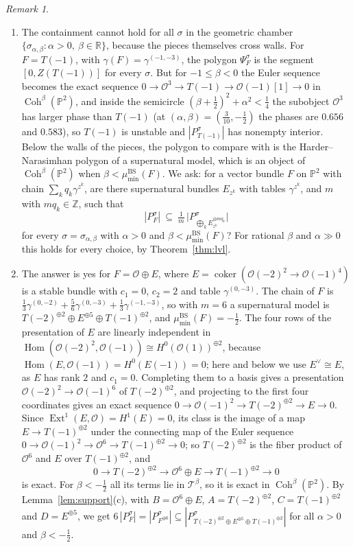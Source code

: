 \documentclass[11pt]{amsart}
\theoremstyle{definition}
\theoremstyle{remark}
\newtheorem{remark}[theorem]{Remark}
\newcommand{\PP}{\mathbb{P}}
\newcommand{\RR}{\mathbb{R}}
\newcommand{\ZZ}{\mathbb{Z}}
\newcommand{\OO}{\mathcal{O}}
\newcommand{\BS}{\mathrm{BS}}
\DeclareMathOperator{\coker}{coker}
\begin{document}
\begin{remark}
\begin{enumerate}[label=(\arabic*)]
\item The containment cannot hold for all $\sigma$ in the geometric chamber $\{\sigma_{\alpha,\beta}:\alpha>0,\ \beta\in\RR\}$, because the pieces themselves cross walls. For $F=T(-1)$, with $\gamma(F)=\gamma^{(-1,-3)}$, the polygon $\Psi^\sigma_F$ is the segment $[0,Z(T(-1))]$ for every $\sigma$. But for $-1\le\beta<0$ the Euler sequence becomes the exact sequence $0\to\OO^3\to T(-1)\to\OO(-1)[1]\to0$ in $\operatorname{Coh}^\beta(\PP^2)$, and inside the semicircle $(\beta+\frac12)^2+\alpha^2<\frac14$ the subobject $\OO^3$ has larger phase than $T(-1)$ (at $(\alpha,\beta)=(\frac3{10},-\frac12)$ the phases are $0.656$ and $0.583$), so $T(-1)$ is unstable and $|P^\sigma_{T(-1)}|$ has nonempty interior. Below the walls of the pieces, the polygon to compare with is the Harder--Narasimhan polygon of a supernatural model, which is an object of $\operatorname{Coh}^\beta(\PP^2)$ when $\beta<\mu^\BS_{\min}(F)$. We ask: for a vector bundle $F$ on $\PP^2$ with chain $\sum_kq_k\gamma^{z^k}$, are there supernatural bundles $E_{z^k}$ with tables $\gamma^{z^k}$, and $m$ with $mq_k\in\ZZ$, such that
\[
|P^\sigma_F|\ \subseteq\ \tfrac1m\,\big|P^\sigma_{\bigoplus_kE_{z^k}^{\oplus mq_k}}\big|
\]
for every $\sigma=\sigma_{\alpha,\beta}$ with $\alpha>0$ and $\beta<\mu^\BS_{\min}(F)$? For rational $\beta$ and $\alpha\gg0$ this holds for every choice, by Theorem~\ref{thm:lvl}.
\item The answer is yes for $F=\OO\oplus E$, where $E=\coker(\OO(-2)^2\to\OO(-1)^4)$ is a stable bundle with $c_1=0$, $c_2=2$ and table $\gamma^{(0,-3)}$. The chain of $F$ is $\frac13\gamma^{(0,-2)}+\frac56\gamma^{(0,-3)}+\frac13\gamma^{(-1,-3)}$, so with $m=6$ a supernatural model is $T(-2)^{\oplus2}\oplus E^{\oplus5}\oplus T(-1)^{\oplus2}$, and $\mu^\BS_{\min}(F)=-\frac12$. The four rows of the presentation of $E$ are linearly independent in $\operatorname{Hom}(\OO(-2)^2,\OO(-1))\cong H^0(\OO(1))^{\oplus2}$, because $\operatorname{Hom}(E,\OO(-1))=H^0(E(-1))=0$; here and below we use $E^\vee\cong E$, as $E$ has rank $2$ and $c_1=0$. Completing them to a basis gives a presentation $\OO(-2)^2\to\OO(-1)^6$ of $T(-2)^{\oplus2}$, and projecting to the first four coordinates gives an exact sequence $0\to\OO(-1)^2\to T(-2)^{\oplus2}\to E\to0$. Since $\operatorname{Ext}^1(E,\OO)=H^1(E)=0$, its class is the image of a map $E\to T(-1)^{\oplus2}$ under the connecting map of the Euler sequence $0\to\OO(-1)^2\to\OO^6\to T(-1)^{\oplus2}\to0$; so $T(-2)^{\oplus2}$ is the fiber product of $\OO^6$ and $E$ over $T(-1)^{\oplus2}$, and
\[
0\to T(-2)^{\oplus2}\to\OO^{6}\oplus E\to T(-1)^{\oplus2}\to0
\]
is exact. For $\beta<-\frac12$ all its terms lie in $\mathcal T^\beta$, so it is exact in $\operatorname{Coh}^\beta(\PP^2)$. By Lemma~\ref{lem:support}(c), with $B=\OO^6\oplus E$, $A=T(-2)^{\oplus2}$, $C=T(-1)^{\oplus2}$ and $D=E^{\oplus5}$, we get $6\,|P^\sigma_F|=|P^\sigma_{F^{\oplus6}}|\subseteq|P^\sigma_{T(-2)^{\oplus2}\oplus E^{\oplus5}\oplus T(-1)^{\oplus2}}|$ for all $\alpha>0$ and $\beta<-\frac12$.
\end{enumerate}
\end{remark}
\end{document}
